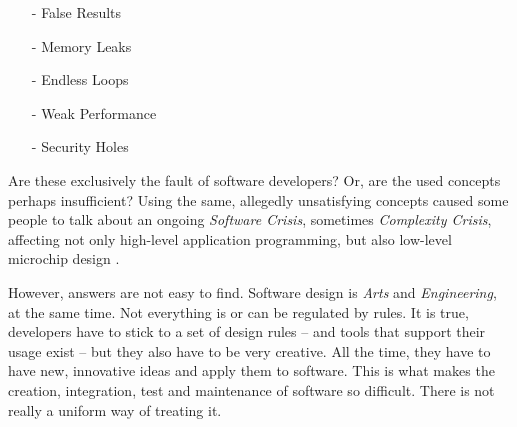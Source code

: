 \begin{itemize}
    \item[-] False Results
    \item[-] Memory Leaks
    \item[-] Endless Loops
    \item[-] Weak Performance
    \item[-] Security Holes
\end{itemize}

Are these exclusively the fault of software developers? Or, are the used
concepts perhaps insufficient? Using the same, allegedly unsatisfying concepts
caused some people to talk about an ongoing \emph{Software Crisis}, sometimes
\emph{Complexity Crisis}, affecting not only high-level application programming,
but also low-level microchip design \cite{daene}.

However, answers are not easy to find. Software design is \emph{Arts} and
\emph{Engineering}, at the same time. Not everything is or can be regulated by
rules. It is true, developers have to stick to a set of design rules -- and
tools that support their usage exist -- but they also have to be very creative.
All the time, they have to have new, innovative ideas and apply them to software.
This is what makes the creation, integration, test and maintenance of software
so difficult. There is not really a uniform way of treating it.
